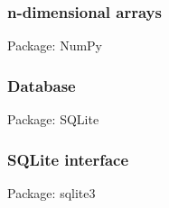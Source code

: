 \subsubsection{n-dimensional arrays}
Package:	NumPy

\subsubsection{Database}
Package:	SQLite

\subsubsection{SQLite interface}
Package:	sqlite3
    
    
    
    
